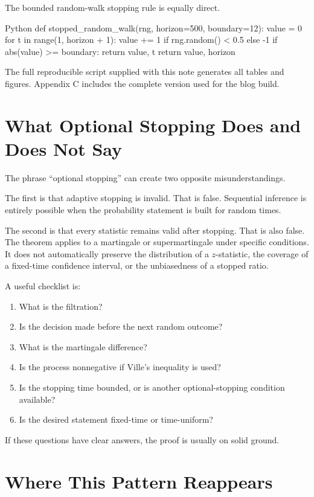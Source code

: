 \documentclass[en,nofont,11pt]{elegantbook}
\begin{document}
The bounded random-walk stopping rule is equally direct.

\begin{codeblock}{Python}
def stopped_random_walk(rng, horizon=500, boundary=12):
    value = 0
    for t in range(1, horizon + 1):
        value += 1 if rng.random() < 0.5 else -1
        if abs(value) >= boundary:
            return value, t
    return value, horizon
\end{codeblock}

The full reproducible script supplied with this note generates all tables and figures. Appendix C includes the complete version used for the blog build.

\chapter{What Optional Stopping Does and Does Not Say}

The phrase ``optional stopping'' can create two opposite misunderstandings.

The first is that adaptive stopping is invalid. That is false. Sequential inference is entirely possible when the probability statement is built for random times.

The second is that every statistic remains valid after stopping. That is also false. The theorem applies to a martingale or supermartingale under specific conditions. It does not automatically preserve the distribution of a $z$-statistic, the coverage of a fixed-time confidence interval, or the unbiasedness of a stopped ratio.

A useful checklist is:

\begin{enumerate}
\item What is the filtration?
\item Is the decision made before the next random outcome?
\item What is the martingale difference?
\item Is the process nonnegative if Ville's inequality is used?
\item Is the stopping time bounded, or is another optional-stopping condition available?
\item Is the desired statement fixed-time or time-uniform?
\end{enumerate}

If these questions have clear answers, the proof is usually on solid ground.

\chapter{Where This Pattern Reappears}
\end{document}
